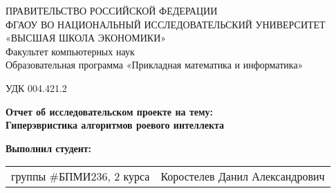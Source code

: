 \begin{titlepage}
    \newpage
    
    {
    \begin{center}
    ПРАВИТЕЛЬСТВО РОССИЙСКОЙ ФЕДЕРАЦИИ\\
    ФГАОУ ВО НАЦИОНАЛЬНЫЙ ИССЛЕДОВАТЕЛЬСКИЙ УНИВЕРСИТЕТ\\
    «ВЫСШАЯ ШКОЛА ЭКОНОМИКИ»
    \\
    \bigskip
    Факультет компьютерных наук\\
    Образовательная программа «Прикладная математика и информатика»
    \end{center}
    }
    
    \vspace{2em}
    УДК 004.421.2 %
    \vspace{4em}
    
    \begin{center}
    {\bf Отчет об исследовательском проекте на тему:}\\
    {\bf Гиперэвристика алгоритмов роевого интеллекта}\\
    \end{center}
    
    \vspace{2em}
    
    {\bf Выполнил студент: \vspace{2mm}}
    
    {
    \begin{tabular}{l@{\hskip 1.5cm}l}
    группы \#БПМИ236, 2 курса & Коростелев Данил Александрович \\
    \end{tabular}}
    
    

\end{titlepage}
